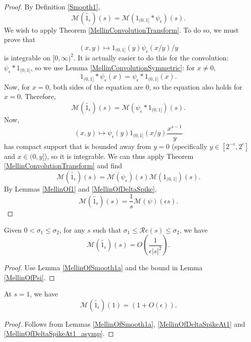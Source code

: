 \begin{proof}
By Definition \ref{Smooth1},
$$
  \mathcal M(\widetilde{1_\epsilon})(s)
  =\mathcal M(1_{(0,1]}\ast\psi_\epsilon)(s)
  .
$$
We wish to apply Theorem \ref{MellinConvolutionTransform}.
To do so, we must prove that
$$
  (x,y)\mapsto 1_{(0,1]}(y)\psi_\epsilon(x/y)/y
$$
is integrable on $[0,\infty)^2$.
It is actually easier to do this for the convolution: $\psi_\epsilon\ast 1_{(0,1]}$, so we use Lemma \ref{MellinConvolutionSymmetric}: for $x\neq0$,
$$
  1_{(0,1]}\ast\psi_\epsilon(x)=\psi_\epsilon\ast 1_{(0,1]}(x)
  .
$$
Now, for $x=0$, both sides of the equation are 0, so the equation also holds for $x=0$.
Therefore,
$$
  \mathcal M(\widetilde{1_\epsilon})(s)
  =\mathcal M(\psi_\epsilon\ast 1_{(0,1]})(s)
  .
$$
Now,
$$
  (x,y)\mapsto \psi_\epsilon(y)1_{(0,1]}(x/y)\frac{x^{s-1}}y
$$
has compact support that is bounded away from $y=0$ (specifically $y\in[2^{-\epsilon},2^\epsilon]$ and $x\in(0,y]$), so it is integrable.
We can thus apply Theorem \ref{MellinConvolutionTransform} and find
$$
  \mathcal M(\widetilde{1_\epsilon})(s)
  =\mathcal M(\psi_\epsilon)(s)\mathcal M(1_{(0,1]})(s)
  .
$$
By Lemmas \ref{MellinOf1} and \ref{MellinOfDeltaSpike},
$$
  \mathcal M(\widetilde{1_\epsilon})(s)
  =\frac1s\mathcal M(\psi)(\epsilon s)
  .
$$
\end{proof}


\begin{lemma}[MellinOfSmooth1b]\label{MellinOfSmooth1b}\leanok
Given $0<\sigma_1\le\sigma_2$, for any $s$ such that $\sigma_1\le\mathcal Re(s)\le\sigma_2$, we have
$$\mathcal{M}(\widetilde{1_{\epsilon}})(s) = O\left(\frac{1}{\epsilon|s|^2}\right).$$
\end{lemma}


\begin{proof}
Use Lemma \ref{MellinOfSmooth1a} and the bound in Lemma \ref{MellinOfPsi}.
\end{proof}


\begin{lemma}[MellinOfSmooth1c]\label{MellinOfSmooth1c}\leanok
At $s=1$, we have
$$\mathcal{M}(\widetilde{1_{\epsilon}})(1) = (1+O(\epsilon)).$$
\end{lemma}


\begin{proof}
Follows from Lemmas \ref{MellinOfSmooth1a}, \ref{MellinOfDeltaSpikeAt1} and \ref{MellinOfDeltaSpikeAt1_asymp}.
\end{proof}

